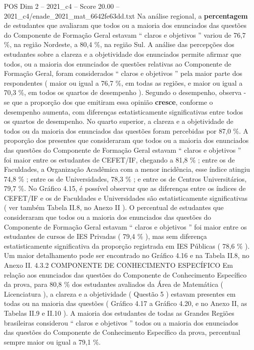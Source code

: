 \begin{textsample}{POS Dim 2 – 2021\_c4 – Score 20.00 – 2021\_c4/enade\_2021\_mat\_6642fe63dd.txt}
Na análise regional, a \textbf{percentagem} de estudantes que avaliaram que todos ou a maioria dos enunciados das questões do Componente de Formação Geral estavam “ claros e objetivos ” variou de 76,7 \%, na região Nordeste, a 80,4 \%, na região Sul.
A análise das percepções dos estudantes sobre a clareza e a objetividade dos enunciados permite afirmar que todos, ou a maioria dos enunciados de questões relativas ao Componente de Formação Geral, foram considerados “ claros e objetivos ” pela maior parte dos respondentes ( maior ou igual a 76,7 \%, em todas as regiões, e maior ou igual a 70,3 \%, em todos os quartos de desempenho ).
Segundo o desempenho, observa -se que a proporção dos que emitiram essa opinião \textbf{cresce}, conforme o desempenho aumenta, com diferenças estatisticamente significativas entre todos os quartos de desempenho.
No quarto superior, a clareza e a objetividade de todos ou da maioria dos enunciados das questões foram percebidas por 87,0 \%.
A proporção dos presentes que consideraram que todos ou a maioria dos enunciados das questões do Componente de Formação Geral estavam “ claros e objetivos ” foi maior entre os estudantes de CEFET/IF, chegando a 81,8 \% ; entre os de Faculdades, a Organização Acadêmica com a menor incidência, esse índice atingiu 74,8 \% ; entre os de Universidades, 78,3 \% ; e entre os de Centros Universitários, 79,7 \%.
No Gráfico 4.15, é possível observar que as diferenças entre os índices de CEFET/IF e os de Faculdades e Universidades são estatisticamente significativas ( ver também Tabela II.8, no Anexo II ).
O percentual de estudantes que consideraram que todos ou a maioria dos enunciados das questões do Componente de Formação Geral estavam “ claros e objetivos ” foi maior entre os estudantes de cursos de IES Privadas ( 79,4 \% ), mas sem diferença estatisticamente significativa da proporção registrada em IES Públicas ( 78,6 \% ).
Um maior detalhamento pode ser encontrado no Gráfico 4.16 e na Tabela II.8, no Anexo II. 4.3.2 COMPONENTE DE CONHECIMENTO ESPECÍFICO Em relação aos enunciados das questões do Componente de Conhecimento Específico da prova, para 80,8 \% dos estudantes avaliados da Área de Matemática ( Licenciatura ), a clareza e a objetividade ( Questão 5 ) estavam presentes em todas ou na maioria das questões ( Gráfico 4.17 a Gráfico 4.20, e no Anexo II, as Tabelas II.9 e II.10 ).
A maioria dos estudantes de todas as Grandes Regiões brasileiras considerou “ claros e objetivos ” todos ou a maioria dos enunciados das questões do Componente de Conhecimento Específico da prova, percentual sempre maior ou igual a 79,1 \%.

\end{textsample}
